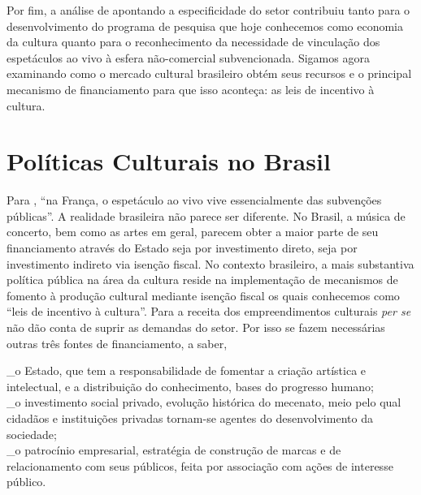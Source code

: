 \documentclass[a4paper, 12pt, openright, oneside, german, french, english, brazil]{abntex2}
\begin{document}
	Por fim, a análise de  apontando a especificidade do setor contribuiu tanto para o desenvolvimento do programa de pesquisa que hoje conhecemos como economia da cultura quanto para o reconhecimento da necessidade de vinculação dos espetáculos ao vivo à esfera não-comercial subvencionada. Sigamos agora examinando como o mercado cultural brasileiro obtém seus recursos e o principal mecanismo de financiamento para que isso aconteça: as leis de incentivo à cultura.

	\section{Políticas Culturais no Brasil}

	Para , ``na França, o espetáculo ao vivo vive essencialmente das subvenções públicas''. A realidade brasileira não parece ser diferente. No Brasil, a música de concerto, bem como as artes em geral, parecem obter a maior parte de seu financiamento através do Estado seja por investimento direto, seja por investimento indireto via isenção fiscal. No contexto brasileiro, a mais substantiva política pública na área da cultura reside na implementação de mecanismos de fomento à produção cultural mediante isenção fiscal os quais conhecemos como ``leis de incentivo à cultura''. Para  a receita dos empreendimentos culturais \textit{per se} não dão conta de suprir as demandas do setor. Por isso se fazem necessárias outras três fontes de financiamento, a saber,

	\begin{citacao}
		\_o Estado, que tem a responsabilidade de fomentar a criação artística e intelectual, e a distribuição do conhecimento, bases do progresso humano;\\
		\_o investimento social privado, evolução histórica do mecenato, meio pelo qual cidadãos e instituições privadas tornam-se agentes do desenvolvimento da sociedade;\\
		\_o patrocínio empresarial, estratégia de construção de marcas e de relacionamento com seus públicos, feita por associação com ações de interesse público. \cite[p. 22]{sarkovas2005incentivo}
	\end{citacao}
\end{document}
